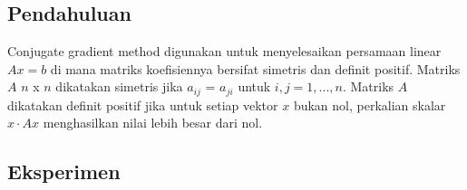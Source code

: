 \chapter{\topikTiga}

\section{Pendahuluan}
	Conjugate gradient method digunakan untuk menyelesaikan persamaan linear $Ax = b$ di mana matriks koefisiennya bersifat simetris dan definit positif.  Matriks $A$ $n$ x $n$ dikatakan simetris jika $a_{ij}$ = $a_{ji}$ untuk $i,j = 1,...,n$.  Matriks $A$ dikatakan definit positif jika untuk setiap vektor $x$ bukan nol, perkalian skalar $x \cdot Ax$ menghasilkan nilai lebih besar dari nol.
\section{Eksperimen}
